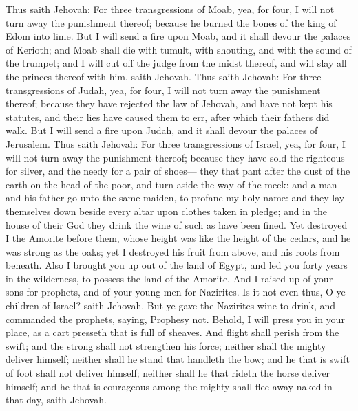 Thus saith Jehovah: For three transgressions of Moab, yea, for four, I will not turn away the punishment thereof; because he burned the bones of the king of Edom into lime. But I will send a fire upon Moab, and it shall devour the palaces of Kerioth; and Moab shall die with tumult, with shouting, and with the sound of the trumpet; and I will cut off the judge from the midst thereof, and will slay all the princes thereof with him, saith Jehovah.  Thus saith Jehovah: For three transgressions of Judah, yea, for four, I will not turn away the punishment thereof; because they have rejected the law of Jehovah, and have not kept his statutes, and their lies have caused them to err, after which their fathers did walk. But I will send a fire upon Judah, and it shall devour the palaces of Jerusalem.  Thus saith Jehovah: For three transgressions of Israel, yea, for four, I will not turn away the punishment thereof; because they have sold the righteous for silver, and the needy for a pair of shoes— they that pant after the dust of the earth on the head of the poor, and turn aside the way of the meek: and a man and his father go unto the same maiden, to profane my holy name: and they lay themselves down beside every altar upon clothes taken in pledge; and in the house of their God they drink the wine of such as have been fined.  Yet destroyed I the Amorite before them, whose height was like the height of the cedars, and he was strong as the oaks; yet I destroyed his fruit from above, and his roots from beneath. Also I brought you up out of the land of Egypt, and led you forty years in the wilderness, to possess the land of the Amorite. And I raised up of your sons for prophets, and of your young men for Nazirites. Is it not even thus, O ye children of Israel? saith Jehovah. But ye gave the Nazirites wine to drink, and commanded the prophets, saying, Prophesy not.  Behold, I will press you in your place, as a cart presseth that is full of sheaves. And flight shall perish from the swift; and the strong shall not strengthen his force; neither shall the mighty deliver himself; neither shall he stand that handleth the bow; and he that is swift of foot shall not deliver himself; neither shall he that rideth the horse deliver himself; and he that is courageous among the mighty shall flee away naked in that day, saith Jehovah. 


